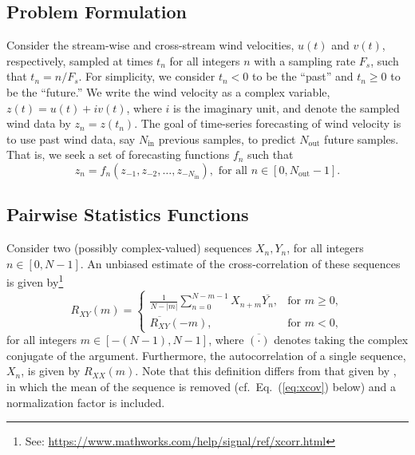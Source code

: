 \documentclass[11pt, oneside]{article}
\newcommand{\eqnref}[1]{Eq.~(\ref{#1})}
\begin{document}
\subsection{Problem Formulation}
Consider the stream-wise and cross-stream wind velocities, $u(t)$ and $v(t)$, respectively, sampled at times $t_n$ for all integers $n$ with a sampling rate $F_s$, such that $t_n = n/F_s$.
For simplicity, we consider $t_n < 0$ to be the ``past'' and $t_n \geq 0$ to be the ``future.''
We write the wind velocity as a complex variable, $z(t) = u(t) + i v(t)$, where $i$ is the imaginary unit, and denote the sampled wind data by $z_n = z(t_n)$.
The goal of time-series forecasting of wind velocity is to use past wind data, say $N_\text{in}$ previous samples, to predict $N_\text{out}$ future samples.
That is, we seek a set of forecasting functions $f_n$ such that
\begin{equation}
z_n = f_n (z_{-1}, z_{-2}, \dots, z_{-N_\text{in}} ), \text{ for all } n \in [0, N_\text{out} - 1].
\end{equation}

\subsection{Pairwise Statistics Functions}
Consider two (possibly complex-valued) sequences $X_n,Y_n$, for all integers $n \in [0,N-1]$.
An unbiased estimate of the cross-correlation of these sequences is given by\footnote{See: \url{https://www.mathworks.com/help/signal/ref/xcorr.html}}
\begin{equation}\label{eq:xcorr}
R_{XY}(m) =
\begin{cases}
\displaystyle \frac{1}{N - |m|} \sum_{n=0}^{N-m-1} X_{n+m} \overline{Y_n}, & \text{for } m \geq 0,\\[20pt]
\overline{R_{XY}}(-m), & \text{for } m < 0,
\end{cases}
\end{equation}
for all integers $m \in [-(N-1),N-1]$, where $\overline{(\cdot)}$ denotes taking the complex conjugate of the argument.
Furthermore, the autocorrelation of a single sequence, $X_n$, is given by $R_{XX}(m)$.
Note that this definition differs from that given by \citet[Sec.~8.2.1]{Stull1988}, in which the mean of the sequence is removed (cf.~\eqnref{eq:xcov} below) and a normalization factor is included.
\end{document}
